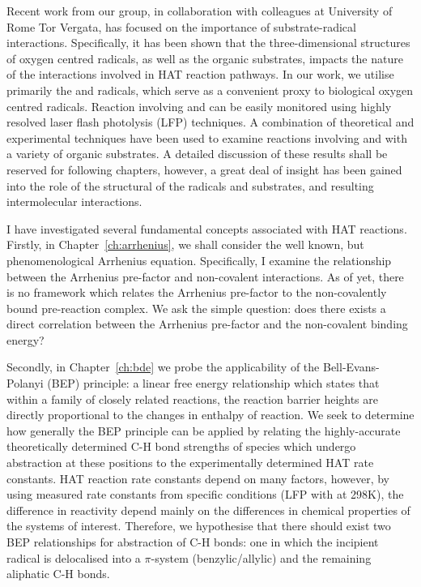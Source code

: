 Recent work from our group, in collaboration with colleagues at University of Rome Tor Vergata, has focused on the importance of substrate-radical interactions. Specifically, it has been shown that the three-dimensional structures of oxygen centred radicals, as well as the organic substrates, impacts the nature of the interactions involved in HAT reaction pathways.\cite{Salamone2015Rev} In our work, we utilise primarily the \bno and \cumo radicals, which serve as a convenient proxy to biological oxygen centred radicals. Reaction involving \bno and \cumo can be easily monitored using highly resolved laser flash photolysis (LFP) techniques. A combination of theoretical and experimental techniques have been used to examine reactions involving \bno and \cumo with a variety of organic substrates. A detailed discussion of these results shall be reserved for following chapters, however, a great deal of insight has been gained into the role of the structural of the radicals and substrates, and resulting intermolecular interactions.

I have investigated several fundamental concepts associated with HAT reactions. Firstly, in Chapter~\ref{ch:arrhenius}, we shall consider the well known, but phenomenological Arrhenius equation. Specifically, I examine the relationship between the Arrhenius pre-factor and non-covalent interactions. As of yet, there is no framework which relates the Arrhenius pre-factor to the non-covalently bound pre-reaction complex. We ask the simple question: does there exists a direct correlation between the Arrhenius pre-factor and the non-covalent binding energy?

Secondly, in Chapter~\ref{ch:bde} we probe the applicability of the Bell-Evans-Polanyi (BEP) principle: a linear free energy relationship which states that within a family of closely related reactions, the reaction barrier heights are directly proportional to the changes in enthalpy of reaction. We seek to determine how generally the BEP principle can be applied by relating the highly-accurate theoretically determined C-H bond strengths of species which undergo abstraction at these positions to the experimentally determined HAT rate constants. HAT reaction rate constants depend on many factors, however, by using measured rate constants from specific conditions (LFP with \cumo at 298K), the difference in reactivity depend mainly on the differences in chemical properties of the systems of interest. Therefore, we hypothesise that there should exist two BEP relationships for abstraction of C-H bonds: one in which the incipient radical is delocalised into a $\pi$-system (benzylic/allylic) and the remaining aliphatic C-H bonds.

